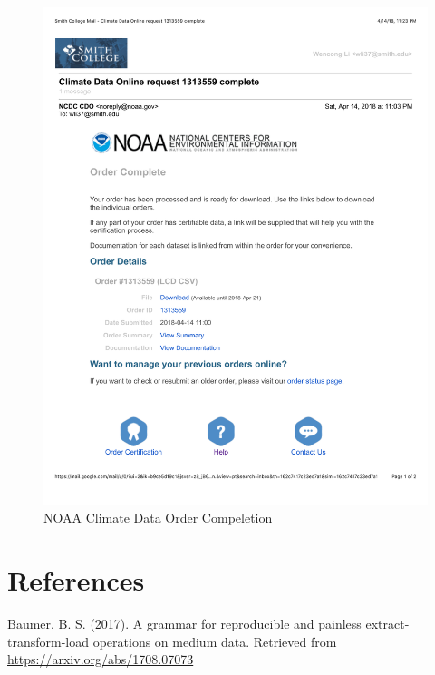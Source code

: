 \documentclass[12pt,twoside]{reedthesis}
\theoremstyle{definition}
\theoremstyle{definition}
\theoremstyle{definition}
\theoremstyle{remark}
\begin{document}
\begin{figure}

{\centering \includegraphics[width=5.8in]{figure/app_noaa_com} 

}

\caption{NOAA Climate Data Order Compeletion}\label{fig:noaacom}
\end{figure}
\backmatter

\chapter*{References}\label{references}


\noindent

\setlength{\parindent}{-0.20in} \setlength{\leftskip}{0.20in}
\setlength{\parskip}{8pt}

\hypertarget{refs}{}
\hypertarget{ref-pkgetl}{}
Baumer, B. S. (2017). A grammar for reproducible and painless
extract-transform-load operations on medium data. Retrieved from
\url{https://arxiv.org/abs/1708.07073}
\end{document}
